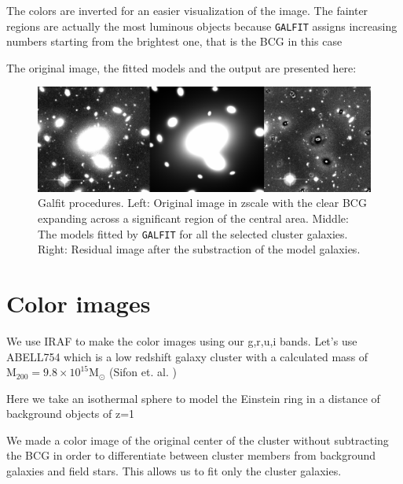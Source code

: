The colors are inverted for an easier visualization of the image. The fainter regions are actually the most luminous objects because \texttt{GALFIT} assigns increasing numbers starting from the brightest one, that is the BCG in this case

The original image, the fitted models and the output are presented here:

\begin{figure}[H]
\centering
\includegraphics[width=15cm]{images/galfit.png}
\caption[Galfit results]{Galfit procedures. Left: Original image in zscale with the clear BCG expanding across a significant region of the central area. Middle: The models fitted by \texttt{GALFIT} for all the selected cluster galaxies. Right: Residual image after the substraction of the model galaxies.}
\end{figure}

\section{Color images} 

We use IRAF to make the color images using our g,r,u,i bands. Let's use ABELL754 which is a low redshift galaxy cluster with a calculated mass of $\text{M}_{200}=9.8\times 10^{15} \text{M}_{\odot}$ (Sifon et. al. \citeyear{Reference9})

Here we take an isothermal sphere to model the Einstein ring in a distance of background objects of z=1

We made a color image of the original center of the cluster without subtracting the BCG in order to differentiate between cluster members from background galaxies and field stars. This allows us to fit only the cluster galaxies. 

